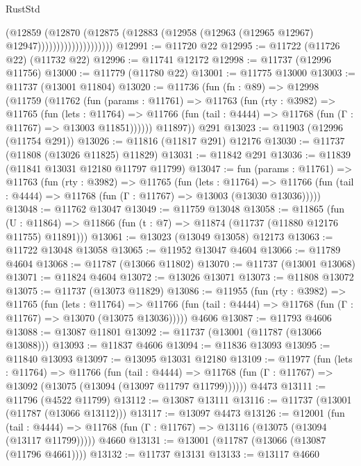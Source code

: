 \begin{lexlean}{RustStd}
\begin{coremodule}
                                (@12859
                                  (@12870
                                    (@12875
                                      (@12883
                                        (@12958 (@12963 (@12965 @12967) @12947))))))))))))))))))))
@12991 := @11720 @22
@12995 := @11722 (@11726 @22) (@11732 @22)
@12996 := @11741 @12172
@12998 := @11737 (@12996 @11756)
@13000 := @11779 (@11780 @22)
@13001 := @11775 @13000
@13003 := @11737 (@13001 @11804)
@13020 := @11736
    (fun (fn : @89) =>
    @12998
      (@11759
        (@11762
          (fun (params : @11761) =>
          @11763
            (fun (rty : @3982) =>
            @11765
              (fun (lets : @11764) =>
              @11766 (fun (tail : @4444) => @11768 (fun (Γ : @11767) => @13003 @11851))))))
        @11897))
    @291
@13023 := @11903 (@12996 (@11754 @291))
@13026 := @11816 (@11817 @291) @12176
@13030 := @11737 (@11808 (@13026 @11825) @11829)
@13031 := @11842 @291
@13036 := @11839 (@11841 @13031 @12180 @11797 @11799)
@13047 := fun (params : @11761) =>
  @11763
    (fun (rty : @3982) =>
    @11765
      (fun (lets : @11764) =>
      @11766 (fun (tail : @4444) => @11768 (fun (Γ : @11767) => @13003 (@13030 @13036)))))
@13048 := @11762 @13047
@13049 := @11759 @13048
@13058 := @11865
    (fun (U : @11864) => @11866 (fun (t : @7) => @11874 (@11737 (@11880 @12176 @11755) @11891)))
@13061 := @13023 (@13049 @13058) @12173
@13063 := @11722 @13048 @13058
@13065 := @11952 @13047 @4604
@13066 := @11789 @4604
@13068 := @11787 (@13066 @11802)
@13070 := @11737 (@13001 @13068)
@13071 := @11824 @4604
@13072 := @13026 @13071
@13073 := @11808 @13072
@13075 := @11737 (@13073 @11829)
@13086 := @11955
    (fun (rty : @3982) =>
    @11765
      (fun (lets : @11764) =>
      @11766 (fun (tail : @4444) => @11768 (fun (Γ : @11767) => @13070 (@13075 @13036)))))
    @4606
@13087 := @11793 @4606
@13088 := @13087 @11801
@13092 := @11737 (@13001 (@11787 (@13066 @13088)))
@13093 := @11837 @4606
@13094 := @11836 @13093
@13095 := @11840 @13093
@13097 := @13095 @13031 @12180
@13109 := @11977
    (fun (lets : @11764) =>
    @11766
      (fun (tail : @4444) =>
      @11768 (fun (Γ : @11767) => @13092 (@13075 (@13094 (@13097 @11797 @11799))))))
    @4473
@13111 := @11796 (@4522 @11799)
@13112 := @13087 @13111
@13116 := @11737 (@13001 (@11787 (@13066 @13112)))
@13117 := @13097 @4473
@13126 := @12001
    (fun (tail : @4444) => @11768 (fun (Γ : @11767) => @13116 (@13075 (@13094 (@13117 @11799)))))
    @4660
@13131 := @13001 (@11787 (@13066 (@13087 (@11796 @4661))))
@13132 := @11737 @13131
@13133 := @13117 @4660

\end{coremodule}
\end{lexlean}
